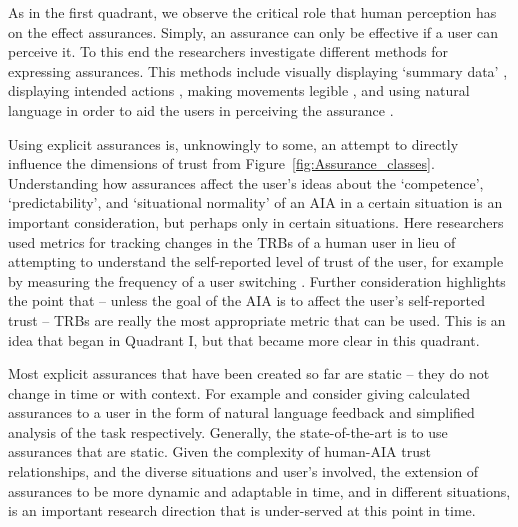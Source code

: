 As in the first quadrant, we observe the critical role that human perception has on the effect assurances. Simply, an assurance can only be effective if a user can perceive it. To this end the researchers investigate different methods for expressing assurances. This methods include visually displaying `summary data' \cite{Muir1996-gt}, displaying intended actions \cite{Chadalavada2015-wx}, making movements legible \cite{Dragan2013-wd}, and using natural language in order to aid the users in perceiving the assurance \cite{Wang2016-id}.

Using explicit assurances is, unknowingly to some, an attempt to directly influence the dimensions of trust from Figure~\ref{fig:Assurance_classes}. Understanding how assurances affect the user's ideas about the `competence', `predictability', and `situational normality' of an AIA in a certain situation is an important consideration, but perhaps only in certain situations. Here researchers used metrics for tracking changes in the TRBs of a human user in lieu of attempting to understand the self-reported level of trust of the user, for example by measuring the frequency of a user switching . Further consideration highlights the point that -- unless the goal of the AIA is to affect the user's self-reported trust -- TRBs are really the most appropriate metric that can be used. This is an idea that began in Quadrant I, but that became more clear in this quadrant.

Most explicit assurances that have been created so far are static -- they do not change in time or with context. For example \cite{Wang2016-id} and \cite{Aitken2016-fb} consider giving calculated assurances to a user in the form of natural language feedback and simplified analysis of the task respectively. Generally, the state-of-the-art is to use assurances that are static. Given the complexity of human-AIA trust relationships, and the diverse situations and user's involved, the extension of assurances to be more dynamic and adaptable in time, and in different situations, is an important research direction that is under-served at this point in time.

